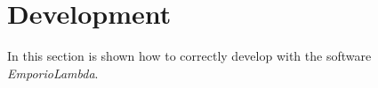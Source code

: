 \section{Development}
In this section is shown how to correctly develop with the software \textit{EmporioLambda}.



